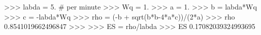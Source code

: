 
>>> labda = 5. # per minute
>>> Wq = 1.
>>> a = 1.
>>> b = labda*Wq
>>> c = -labda*Wq
>>> rho = (-b + sqrt(b*b-4*a*c))/(2*a)
>>> rho
0.8541019662496847
>>>
>>> ES = rho/labda
>>> ES
0.17082039324993695

